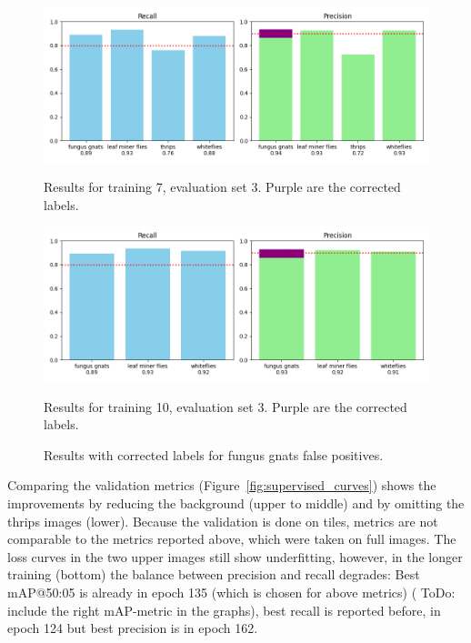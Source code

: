 \documentclass[12pt,a4paper]{article}
\begin{document}
\begin{figure}[H]
    \centering
    \begin{minipage}{0.48\textwidth}
        \centering
        \includegraphics[width=\linewidth]{images/train7eval3.png}
        \caption{Results for training 7, evaluation set 3. Purple are the corrected labels.}
    \end{minipage}\hfill
    \begin{minipage}{0.48\textwidth}
        \centering
        \includegraphics[width=\linewidth]{images/train10eval3.png}
        \caption{Results for training 10, evaluation set 3. Purple are the corrected labels.}
    \end{minipage}
    \caption{Results with corrected labels for fungus gnats false positives.}
    \label{fig:supervised_final_results}
\end{figure}

Comparing the validation metrics (Figure~\ref{fig:supervised_curves}) shows the improvements by reducing the background (upper to middle) and by omitting the thrips images (lower). Because the validation is done on tiles, metrics are not comparable to the metrics reported above, which were taken on full images. The loss curves in the two upper images still show underfitting, however, in the longer training (bottom) the balance between precision and recall degrades: Best mAP@50:05 is already in epoch 135 (which is chosen for above metrics) ({\color{red} ToDo: include the right mAP-metric in the graphs}), best recall is reported before, in epoch 124 but best precision is in epoch 162.
\end{document}
